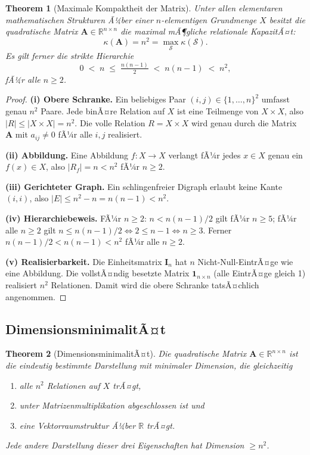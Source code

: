 ﻿\documentclass[12pt, a4paper]{article}
\newtheorem{theorem}{Theorem}[section]
\theoremstyle{definition}
\theoremstyle{remark}
\newcommand{\R}{\mathbb{R}}
\newcommand{\vA}{\bm{A}}
\newcommand{\vI}{\bm{I}}
\begin{document}
\begin{theorem}[Maximale Kompaktheit der Matrix]
\label{thm:maxkompakt}
Unter allen elementaren mathematischen Strukturen Ã¼ber einer
$n$-elementigen Grundmenge $X$ besitzt die quadratische Matrix
$\vA \in \R^{n \times n}$ die maximal mÃ¶gliche relationale KapazitÃ¤t:
\[
  \kappa(\vA) = n^2 = \max_{\mathcal{S}} \kappa(\mathcal{S}).
\]
Es gilt ferner die strikte Hierarchie
\[
  0 \;<\; n \;\leq\; \tfrac{n(n-1)}{2} \;<\; n(n-1) \;<\; n^2,
\]
fÃ¼r alle $n \geq 2$.
\end{theorem}

\begin{proof}
\textbf{(i) Obere Schranke.}
Ein beliebiges Paar $(i,j) \in \{1,\ldots,n\}^2$ umfasst genau $n^2$
Paare. Jede binÃ¤re Relation auf $X$ ist eine Teilmenge von $X \times X$,
also $|R| \leq |X \times X| = n^2$. Die volle Relation
$R = X \times X$ wird genau durch die Matrix $\vA$ mit $a_{ij} \neq 0$
fÃ¼r alle $i,j$ realisiert.

\textbf{(ii) Abbildung.}
Eine Abbildung $f: X \to X$ verlangt fÃ¼r jedes $x \in X$ genau ein
$f(x) \in X$, also $|R_f| = n < n^2$ fÃ¼r $n \geq 2$.

\textbf{(iii) Gerichteter Graph.}
Ein schlingenfreier Digraph erlaubt keine Kante $(i,i)$, also
$|E| \leq n^2 - n = n(n-1) < n^2$.

\textbf{(iv) Hierarchiebeweis.}
FÃ¼r $n \geq 2$: $n < n(n-1)/2$ gilt fÃ¼r $n \geq 5$; fÃ¼r alle $n \geq 2$
gilt $n \leq n(n-1)/2 \Leftrightarrow 2 \leq n-1 \Leftrightarrow n \geq 3$.
Ferner $n(n-1)/2 < n(n-1) < n^2$ fÃ¼r alle $n \geq 2$.

\textbf{(v) Realisierbarkeit.}
Die Einheitsmatrix $\vI_n$ hat $n$ Nicht-Null-EintrÃ¤ge wie eine
Abbildung. Die vollstÃ¤ndig besetzte Matrix $\mathbf{1}_{n \times n}$
(alle EintrÃ¤ge gleich 1) realisiert $n^2$ Relationen. Damit wird die
obere Schranke tatsÃ¤chlich angenommen.
\end{proof}

\subsection{DimensionsminimalitÃ¤t}
\label{subsec:minimal}

\begin{theorem}[DimensionsminimalitÃ¤t]
\label{thm:dimmin}
Die quadratische Matrix $\vA \in \R^{n \times n}$ ist die eindeutig
bestimmte Darstellung mit minimaler Dimension, die gleichzeitig
\begin{enumerate}[label=(\roman*)]
  \item alle $n^2$ Relationen auf $X$ trÃ¤gt,
  \item unter Matrizenmultiplikation abgeschlossen ist und
  \item eine Vektorraumstruktur Ã¼ber $\R$ trÃ¤gt.
\end{enumerate}
Jede andere Darstellung dieser drei Eigenschaften hat Dimension
$\geq n^2$.
\end{theorem}
\end{document}
